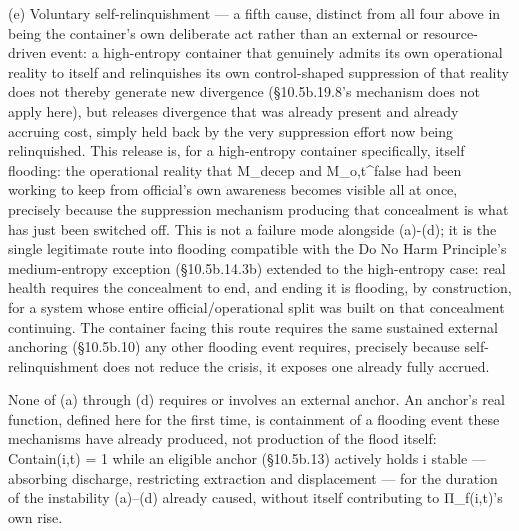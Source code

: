 \documentclass[
]{article}
\begin{document}
(e) Voluntary self-relinquishment --- a fifth cause, distinct from all
four above in being the container's own deliberate act rather than an
external or resource-driven event: a high-entropy container that
genuinely admits its own operational reality to itself and relinquishes
its own control-shaped suppression of that reality does not thereby
generate new divergence (§10.5b.19.8's mechanism does not apply here),
but releases divergence that was already present and already accruing
cost, simply held back by the very suppression effort now being
relinquished. This release is, for a high-entropy container
specifically, itself flooding: the operational reality that M\_decep and
M\_o,t\^{}false had been working to keep from official's own awareness
becomes visible all at once, precisely because the suppression mechanism
producing that concealment is what has just been switched off. This is
not a failure mode alongside (a)-(d); it is the single legitimate route
into flooding compatible with the Do No Harm Principle's medium-entropy
exception (§10.5b.14.3b) extended to the high-entropy case: real health
requires the concealment to end, and ending it is flooding, by
construction, for a system whose entire official/operational split was
built on that concealment continuing. The container facing this route
requires the same sustained external anchoring (§10.5b.10) any other
flooding event requires, precisely because self-relinquishment does not
reduce the crisis, it exposes one already fully accrued.

None of (a) through (d) requires or involves an external anchor. An
anchor's real function, defined here for the first time, is containment
of a flooding event these mechanisms have already produced, not
production of the flood itself: Contain(i,t) = 1 while an eligible
anchor (§10.5b.13) actively holds i stable --- absorbing discharge,
restricting extraction and displacement --- for the duration of the
instability (a)--(d) already caused, without itself contributing to
Π\_f(i,t)'s own rise.
\end{document}
